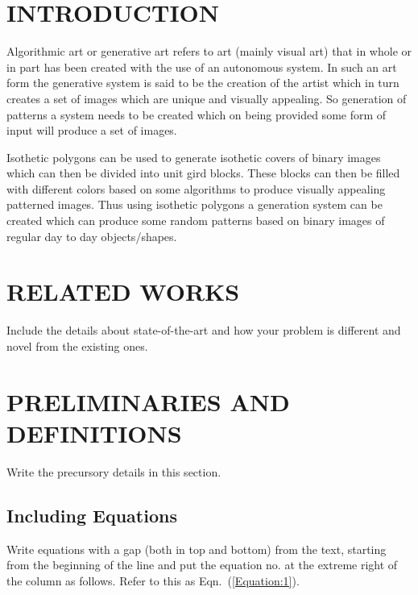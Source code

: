 \documentclass[12pt]{article}
\begin{document}
\newpage
\tableofcontents
\newpage
\newenvironment{mydef}[1]{\begin{definition} #1 \mbox{\\}
\rm}{\end{definition}}




\section{INTRODUCTION}
Algorithmic art or generative art refers to art (mainly visual art) that in whole or in part has been created with the use of an autonomous system. In such an art form the generative system is said to be the creation of the artist which in turn creates a set of images which are unique and visually appealing.  
So generation of patterns a system needs to be created which on being provided some form of input will produce a set of images.

\vspace{0.3cm} 
Isothetic polygons can be used to generate isothetic covers of binary images which can then be divided into unit gird blocks. These blocks can then be filled with different colors based on some algorithms to produce visually appealing patterned images. Thus using isothetic polygons a generation system can be created which can produce some random patterns based on binary images of regular day to day objects/shapes. 
\vspace{0.3cm}

\newpage




\section{RELATED WORKS}
Include the details about state-of-the-art and how your problem is different and novel from the existing ones.




\newpage




\section{PRELIMINARIES AND DEFINITIONS}
Write the precursory details in this section.


\subsection{Including Equations}
Write equations with a gap (both in top and bottom) from the text, starting from the beginning of the line and put the equation no. at the extreme right of the column as follows. Refer to this as Eqn.~(\ref{Equation:1}).
\end{document}
